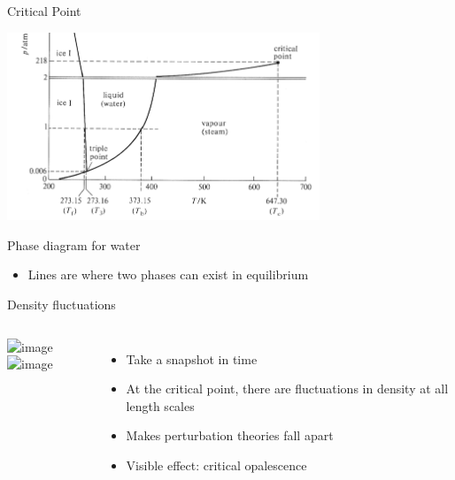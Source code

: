 \documentclass[xcolor=dvipsnames]{beamer}
\begin{document}
\subsection{} %

\begin{frame}{Critical Point}
  \begin{center}
    \includegraphics[width=0.7\textwidth]{figs/phase-diagram-zoom}

    Phase diagram for water
  \end{center}

  \begin{itemize}
    \item Lines are where two phases can exist in equilibrium
  \end{itemize}

\end{frame}

\begin{frame}{Density fluctuations}
  \begin{columns}[T]
  \includegraphics<1>[width=\columnwidth]{~/deft/papers/renormalization/figs/fluctuations}
  \includegraphics<2>[width=\columnwidth]{figs/critical-opalescence}


  \begin{itemize}
    \item Take a snapshot in time
    \item At the critical point, there are fluctuations in density at all length scales
    \item Makes perturbation theories fall apart
    \item Visible effect: critical opalescence
  \end{itemize}
  \end{columns}
\end{frame}
\end{document}
